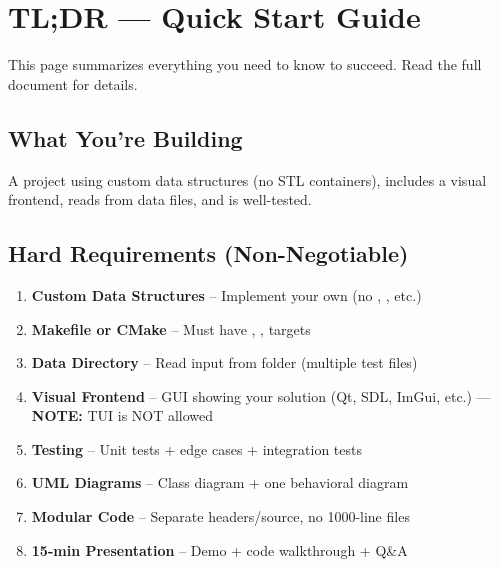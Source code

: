 
\section*{TL;DR --- Quick Start Guide}

This page summarizes everything you need to know to succeed. Read the full document for details.

\subsection*{What You're Building}

A \cpp{} project using custom data structures (no STL containers), includes a visual frontend, reads from data files, and is well-tested.

\subsection*{Hard Requirements (Non-Negotiable)}

\begin{constraintbox}[MANDATORY --- Missing any of these = significant point loss]
\begin{enumerate}
  \item \textbf{Custom Data Structures} -- Implement your own (no \stdvec, \stdmap, etc.)
  \item \textbf{Makefile or CMake} -- Must have \make, \maketest, \makeclean{} targets
  \item \textbf{Data Directory} -- Read input from  folder (multiple test files)
  \item \textbf{Visual Frontend} -- GUI showing your solution (Qt, SDL, ImGui, etc.) --- \textbf{NOTE:} TUI is NOT allowed
  \item \textbf{Testing} -- Unit tests + edge cases + integration tests
  \item \textbf{UML Diagrams} -- Class diagram + one behavioral diagram
  \item \textbf{Modular Code} -- Separate headers/source, no 1000-line files
  \item \textbf{15-min Presentation} -- Demo + code walkthrough + Q\&A
\end{enumerate}
\end{constraintbox}

